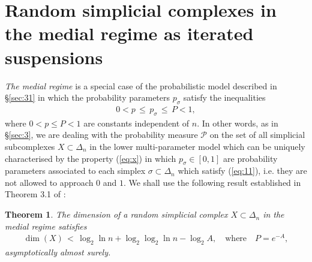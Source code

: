 \documentclass[10pt,a4paper]{amsart}
\newtheorem{teo}[lema]{Theorem}
\begin{document}
\section{Random simplicial complexes in the medial regime as iterated suspensions}









{\it The medial regime} \cite{FM} is a special case of the probabilistic model described in \S \ref{sec:31} in which the probability parameters $p_\sigma$ satisfy the inequalities
\begin{eqnarray}\label{eq:11}
0<p\, \le\, p_\sigma\, \le\,  P<1,
\end{eqnarray}
where $0<p\le P<1$ are constants independent of $n$. 
In other words, as in \S \ref{sec:3}, we are dealing with the probability measure $\mathcal P$ on the set of all simplicial subcomplexes $X\subset \Delta_n$ in the lower multi-parameter model which can be uniquely characterised by the property (\ref{eq:x}) in which $p_\sigma\in [0,1]$ are probability parameters associated to each simplex $\sigma\subset \Delta_n$ which satisfy (\ref{eq:11}), i.e. they are not allowed to approach $0$ and $1$. 
We shall use the following result established in Theorem 3.1 of \cite{FM}:
\begin{teo}\label{thm10}
The dimension of a random simplicial complex $X\subset \Delta_n$ in the medial regime satisfies 
\begin{eqnarray*}\label{dimupper1}
\dim(X)  \, < \,  \log_2\ln n +\log_2\log_2\ln n- \log_2 A, \quad \mbox{where}\quad P=e^{-A},
\end{eqnarray*}
asymptotically almost surely.
\end{teo}
\end{document}
